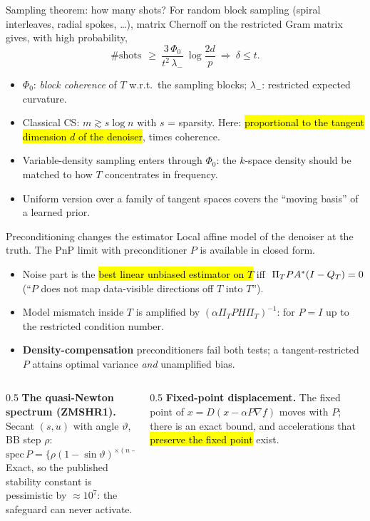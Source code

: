 \begin{frame}{Sampling theorem: how many shots?}
\small
For random block sampling (spiral interleaves, radial spokes, \dots), matrix Chernoff on the restricted Gram matrix gives, with high probability,
\[ \#\text{shots}\ \ \ge\ \frac{3\,\Phi_0}{t^2\,\lambda_-}\ \log\frac{2d}{p}\ \Longrightarrow\ \delta\le t. \]
\begin{itemize}
\item $\Phi_0$: \emph{block coherence} of $T$ w.r.t.\ the sampling blocks; $\lambda_-$: restricted expected curvature.
\item Classical CS: $m\gtrsim s\log n$ with $s$ = sparsity. Here: \hl{proportional to the tangent dimension $d$ of the denoiser}, times coherence.
\item Variable-density sampling enters through $\Phi_0$: the $k$-space density should be matched to how $T$ concentrates in frequency.
\item Uniform version over a family of tangent spaces covers the ``moving basis'' of a learned prior.
\end{itemize}
\end{frame}

\iflong
\begin{frame}{Preconditioning changes the estimator}
\footnotesize
Local affine model of the denoiser at the truth. The PnP limit with preconditioner $P$ is available in closed form.
\begin{itemize}
\item Noise part is the \hl{best linear unbiased estimator on $T$} iff $\ \Pi_T P A^{*}(I-Q_T)=0$ (``$P$ does not map data-visible directions off $T$ into $T$'').
\item Model mismatch inside $T$ is amplified by $(\alpha\Pi_T P H\Pi_T)^{-1}$: for $P=I$ up to the restricted condition number.
\item \textbf{Density-compensation} preconditioners fail both tests; a tangent-restricted $P$ attains optimal variance \emph{and} unamplified bias.
\end{itemize}
\pause
\begin{columns}[T]
\begin{column}{0.5\textwidth}
\textbf{The quasi-Newton spectrum (ZMSHR1).} Secant $(s,u)$ with angle $\vartheta$, BB step $\rho$:
\[ \mathrm{spec}\,P=\{\rho(1-\sin\vartheta)^{\times(n-1)},\ \rho(1+\sin\vartheta)\}. \]
Exact, so the published stability constant is pessimistic by $\approx10^{7}$: the safeguard can never activate.
\end{column}
\begin{column}{0.5\textwidth}
\textbf{Fixed-point displacement.} The fixed point of $x=D(x-\alpha P\nabla f)$ moves with $P$; there is an exact bound, and accelerations that \hl{preserve the fixed point} exist.
\end{column}
\end{columns}
\end{frame}
\fi

